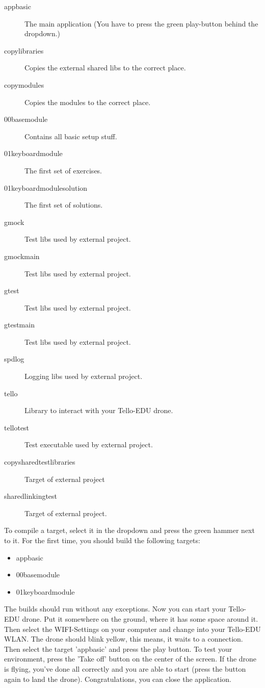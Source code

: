 \begin{description}
    \item[app\textunderscore basic] The main application (You have to press the green play-button behind the dropdown.)
    \item[copy\textunderscore libraries] Copies the external shared libs to the correct place.
    \item[copy\textunderscore modules] Copies the modules to the correct place.
    \item[00\textunderscore base\textunderscore module] Contains all basic setup stuff.
    \item[01\textunderscore keyboard\textunderscore module] The first set of exercises.
    \item[01\textunderscore keyboard\textunderscore module\textunderscore solution] The first set of solutions.
    \item[gmock] Test libs used by external project.
    \item[gmock\textunderscore main] Test libs used by external project.
    \item[gtest] Test libs used by external project.
    \item[gtest\textunderscore main] Test libs used by external project.
    \item[spdlog] Logging libs used by external project.
    \item[tello] Library to interact with your Tello-EDU drone.
    \item[tello\textunderscore test] Test executable used by external project.
    \item[copy\textunderscore shared\textunderscore test\textunderscore libraries] Target of external project
    \item[shared\textunderscore linking\textunderscore test] Target of external project.
\end{description}
\newpage
To compile a target, select it in the dropdown and press the green hammer next to it.
For the first time, you should build the following targets:
\begin{itemize}
    \item app\textunderscore basic
    \item 00\textunderscore base\textunderscore module
    \item 01\textunderscore keyboard\textunderscore module
\end{itemize}
The builds should run without any exceptions.
Now you can start your Tello-EDU drone. Put it somewhere on the ground, where it has some space around it.
Then select the WIFI-Settings on your computer and change into your Tello-EDU WLAN. The drone should blink yellow, this
means, it waits to a connection.\newline
Then select the target 'app\textunderscore basic' and press the play button. To test your environment, press the
'Take off' button on the center of the screen. If the drone is flying, you've done all correctly and you are
able to start (press the button again to land the drone). Congratulations, you can close the application.
